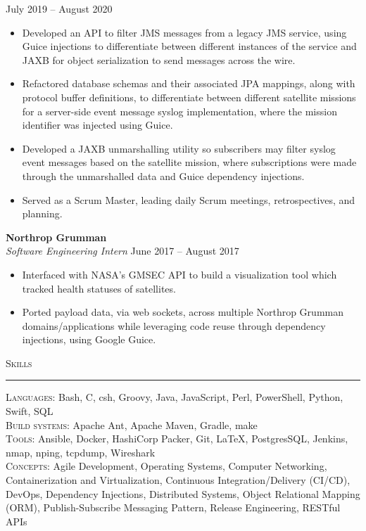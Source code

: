 \documentclass{res}
\begin{document}
\begin{resume}
\hfill
July 2019 -- August 2020\\[1mm]
	\begin{itemize}
		\vspace{-3mm}
    \item Developed an API to filter JMS messages from a legacy JMS service, using Guice injections to differentiate between different instances of the service and JAXB for object serialization to send messages across the wire.
    \item Refactored database schemas and their associated JPA mappings, along with protocol buffer definitions, to differentiate between different satellite missions for a server-side event message syslog implementation, where the mission identifier was injected using Guice.
    \item Developed a JAXB unmarshalling utility so subscribers may filter syslog event messages based on the satellite mission, where subscriptions were made through the unmarshalled data and Guice dependency injections.
    \item Served as a Scrum Master, leading daily Scrum meetings, retrospectives, and planning.
  \end{itemize}
\textbf{Northrop Grumman}\\
\textit{Software Engineering Intern}
\hfill
June 2017 -- August 2017\\[1mm]
	\begin{itemize}
		\vspace{-3mm}
  \item Interfaced with NASA's GMSEC API to build a visualization tool which tracked health statuses of satellites.
  \item Ported payload data, via web sockets, across multiple Northrop Grumman domains/applications while leveraging code reuse through dependency injections, using Google Guice.
	\end{itemize}
\textsc{{\Large Skills}}
\vspace{0.5mm}
\hrule width18.5cm
\textsc{Languages:} Bash, C, csh, Groovy, Java, JavaScript, Perl, PowerShell, Python, Swift, SQL\\[2mm]
\textsc{Build systems:} Apache Ant, Apache Maven, Gradle, make\\[2mm]
\textsc{Tools:} Ansible, Docker, HashiCorp Packer, Git, \LaTeX, PostgresSQL, Jenkins, nmap, nping, tcpdump, Wireshark\\[2mm]
\textsc{Concepts:} Agile Development, Operating Systems, Computer Networking, Containerization and Virtualization, Continuous Integration/Delivery (CI/CD), DevOps, Dependency Injections, Distributed Systems, Object Relational Mapping (ORM), Publish-Subscribe Messaging Pattern, Release Engineering, RESTful APIs\\[0.5mm]
\vspace{-2mm}
\end{resume}
\end{document}
